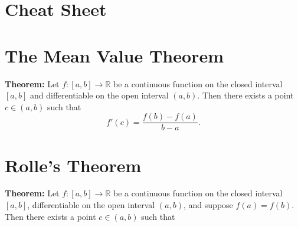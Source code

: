 \documentclass{article}
\begin{document}
\section*{Cheat Sheet}

\section*{The Mean Value Theorem}
\textbf{Theorem:} Let $f: [a, b] \to \mathbb{R}$ be a continuous function on the closed interval $[a, b]$ and differentiable on the open interval $(a, b)$. Then there exists a point $c \in (a, b)$ such that
\[
f'(c) = \frac{f(b) - f(a)}{b - a}.
\]

\section*{Rolle's Theorem}
\textbf{Theorem:} Let $f: [a, b] \to \mathbb{R}$ be a continuous function on the closed interval $[a, b]$, differentiable on the open interval $(a, b)$, and suppose $f(a) = f(b)$. Then there exists a point $c \in (a, b)$ such that
\end{document}
